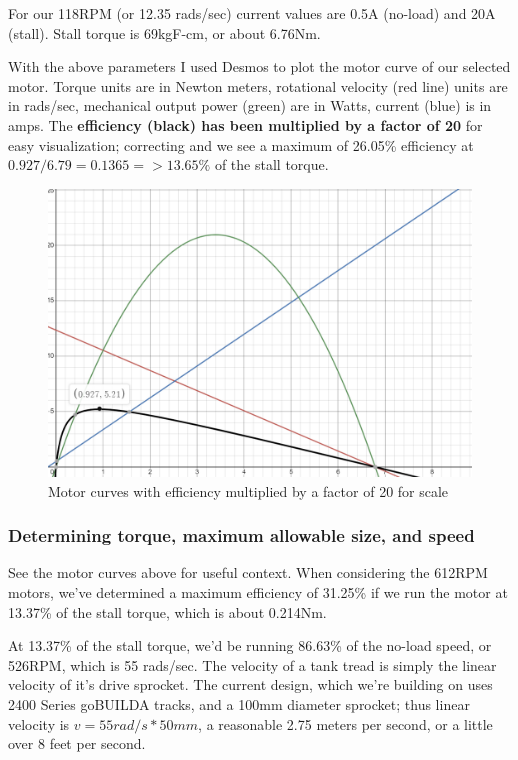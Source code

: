 \documentclass[a4paper, 10pt]{article}
\begin{document}
		For our 118RPM (or 12.35 rads/sec) current values are 0.5A (no-load) and 20A (stall). Stall torque is 69kgF-cm, or about 6.76Nm. 
		
		With the above parameters I used Desmos to plot the motor curve of our selected motor. Torque units are in Newton meters, rotational velocity (red line) units are in rads/sec, mechanical output power (green) are in Watts, current (blue) is in amps. The \textbf{efficiency (black) has been multiplied by a factor of 20} for easy visualization; correcting and we see a maximum of 26.05\% efficiency at $ 0.927/6.79 = 0.1365 => 13.65\% $ of the stall torque. 
		
		\begin{figure} [!h]
			\centering
			\includegraphics[scale=0.5]{Photos/motor_curves_118}
			\caption{Motor curves with efficiency multiplied by a factor of 20 for scale}
			\label{motor_curves_118}
		\end{figure}

		\subsubsection*{Determining torque, maximum allowable size, and speed}
		See the motor curves above for useful context. When considering the 612RPM motors, we've determined a maximum efficiency of 31.25\% if we run the motor at 13.37\% of the stall torque, which is about 0.214Nm. 
		
		At 13.37\% of the stall torque, we'd be running 86.63\% of the no-load speed, or 526RPM, which is 55 rads/sec. The velocity of a tank tread is simply the linear velocity of it's drive sprocket. The current design, which we're building on uses 2400 Series goBUILDA tracks, and a 100mm diameter sprocket; thus linear velocity is $v = 55rad/s * 50mm$, a reasonable 2.75 meters per second, or a little over 8 feet per second. 
		
\end{document}
